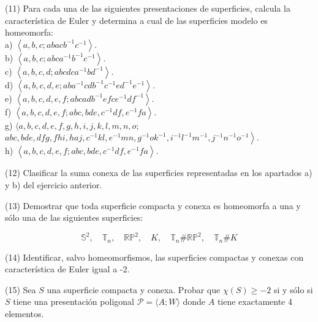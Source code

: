 \documentclass[
  a4paper,
  spanish,
  12pt,
]{scrartcl}
\begin{document}
\begin{ejer}
(11) Para cada una de las siguientes presentaciones de superficies, calcula la característica de Euler y determina a cual de las superficies modelo es homeomorfa:\\
a) $\left\langle a, b, c ; a b a c b^{-1} c^{-1}\right\rangle$.\\
b) $\left\langle a, b, c ; a b c a^{-1} b^{-1} c^{-1}\right\rangle$.\\
c) $\left\langle a, b, c, d ; a b c d c a^{-1} b d^{-1}\right\rangle$.\\
d) $\left\langle a, b, c, d, e ; a b a^{-1} c d b^{-1} c^{-1} e d^{-1} e^{-1}\right\rangle$.\\
e) $\left\langle a, b, c, d, e, f ; a b c a d b^{-1} e f c e^{-1} d f^{-1}\right\rangle$.\\
f) $\left\langle a, b, c, d, e, f ; a b c, b d e, c^{-1} d f, e^{-1} f a\right\rangle$.\\
g) $\langle a, b, c, d, e, f, g, h, i, j, k, l, m, n, o$;\\
$\left.a b c, b d e, d f g, f h i, h a j, c^{-1} k l, e^{-1} m n, g^{-1} o k^{-1}, i^{-1} l^{-1} m^{-1}, j^{-1} n^{-1} o^{-1}\right\rangle$.\\
h) $\left\langle a, b, c, d, e, f ; a b c, b d e, c^{-1} d f, e^{-1} f a\right\rangle$.\\
\end{ejer}

\begin{ejer}
(12) Clasificar la suma conexa de las superficies representadas en los apartados a) y b) del ejercicio anterior.\\
\end{ejer}

\begin{ejer}
(13) Demostrar que toda superficie compacta y conexa es homeomorfa a una y sólo una de las siguientes superficies:

$$
\mathbb{S}^{2}, \quad \mathbb{T}_{n}, \quad \mathbb{R P}^{2}, \quad K, \quad \mathbb{T}_{n} \# \mathbb{R} \mathbb{P}^{2}, \quad \mathbb{T}_{n} \# K
$$
\end{ejer}

\begin{ejer}
(14) Identificar, salvo homeomorfismos, las superficies compactas y conexas con característica de Euler igual a -2.\\
\end{ejer}

\begin{ejer}
(15) Sea $S$ una superficie compacta y conexa. Probar que $\chi(S) \geq-2$ si y sólo si $S$ tiene una presentación poligonal $\mathscr{P}=\langle A ; W\rangle$ donde $A$ tiene exactamente 4 elementos.\\
\end{ejer}
\end{document}
